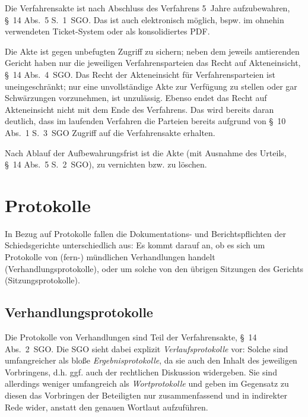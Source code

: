 Die Verfahrensakte ist nach Abschluss des Verfahrens 5~Jahre aufzubewahren, \S~14 Abs.~5 S.~1~SGO.
Das ist auch elektronisch möglich, bspw. im ohnehin verwendeten Ticket-System oder als konsolidiertes PDF.

Die Akte ist gegen unbefugten Zugriff zu sichern; neben dem jeweils amtierenden Gericht haben nur die jeweiligen Verfahrensparteien das Recht auf Akteneinsicht, \S~14 Abs.~4~SGO.
Das Recht der Akteneinsicht für Verfahrensparteien ist uneingeschränkt; nur eine unvollständige Akte zur Verfügung zu stellen oder gar Schwärzungen vorzunehmen, ist unzulässig.
Ebenso endet das Recht auf Akteneinsicht nicht mit dem Ende des Verfahrens.
Das wird bereits daran deutlich, dass im laufenden Verfahren die Parteien bereits aufgrund von \S~10 Abs.~1 S.~3~SGO Zugriff auf die Verfahrensakte erhalten.

Nach Ablauf der Aufbewahrungsfrist ist die Akte (mit Ausnahme des Urteils, \S~14 Abs.~5 S.~2~SGO), zu vernichten bzw. zu löschen.

\section{Protokolle}
\label{Dokumentation:Protokolle}
In Bezug auf Protokolle fallen die Dokumentations- und Berichtspflichten der Schiedsgerichte unterschiedlich aus:
Es kommt darauf an, ob es sich um Protokolle von (fern-) mündlichen Verhandlungen handelt (Verhandlungsprotokolle), oder um solche von den übrigen Sitzungen des Gerichts (Sitzungsprotokolle).

\subsection{Verhandlungsprotokolle}
\label{Dokumentation:Protokolle:Verhandlungsprotokolle}
Die Protokolle von Verhandlungen sind Teil der Verfahrensakte, \S~14 Abs.~2~SGO.
Die SGO sieht dabei explizit \emph{Verlaufsprotokolle} vor:
Solche sind umfangreicher als bloße \emph{Ergebnisprotokolle}, da sie auch den Inhalt des jeweiligen Vorbringens, d.h. ggf. auch der rechtlichen Diskussion widergeben.
Sie sind allerdings weniger umfangreich als \emph{Wortprotokolle} und geben im Gegensatz zu diesen das Vorbringen der Beteiligten nur zusammenfassend und in indirekter Rede wider, anstatt den genauen Wortlaut aufzuführen.

